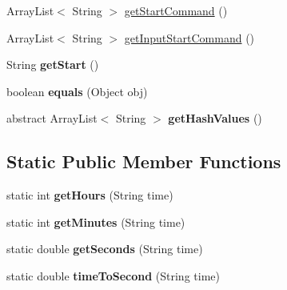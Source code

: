 \begin{DoxyCompactItemize}
\item 
ArrayList$<$ String $>$ \hyperlink{classvideo_1_1_profile_a378d8b6a9e694eb8051444a86ff7cad6}{getStartCommand} ()
\item 
ArrayList$<$ String $>$ \hyperlink{classvideo_1_1_profile_ae07aec7f4a871628fec90c056cf22638}{getInputStartCommand} ()
\item 
\hypertarget{classvideo_1_1_profile_ab5ed488fda54be68089310b63b854807}{
String {\bfseries getStart} ()}
\label{classvideo_1_1_profile_ab5ed488fda54be68089310b63b854807}

\item 
\hypertarget{classvideo_1_1_profile_ae8256f1d4879880a5e0557cbfff13237}{
boolean {\bfseries equals} (Object obj)}
\label{classvideo_1_1_profile_ae8256f1d4879880a5e0557cbfff13237}

\item 
\hypertarget{classvideo_1_1_profile_a6d6c49fde96388b672b165cce3fb0ebd}{
abstract ArrayList$<$ String $>$ {\bfseries getHashValues} ()}
\label{classvideo_1_1_profile_a6d6c49fde96388b672b165cce3fb0ebd}

\end{DoxyCompactItemize}
\subsection*{Static Public Member Functions}
\begin{DoxyCompactItemize}
\item 
\hypertarget{classvideo_1_1_profile_a1564131af01a721970347c072ab74cee}{
static int {\bfseries getHours} (String time)}
\label{classvideo_1_1_profile_a1564131af01a721970347c072ab74cee}

\item 
\hypertarget{classvideo_1_1_profile_ac055604e2ca11b4542f4950edd1ed8e8}{
static int {\bfseries getMinutes} (String time)}
\label{classvideo_1_1_profile_ac055604e2ca11b4542f4950edd1ed8e8}

\item 
\hypertarget{classvideo_1_1_profile_abfbff1b50a286514a7360e8a487c8df1}{
static double {\bfseries getSeconds} (String time)}
\label{classvideo_1_1_profile_abfbff1b50a286514a7360e8a487c8df1}

\item 
\hypertarget{classvideo_1_1_profile_ae9c355bb1ad4eea4710e1576f6491e7b}{
static double {\bfseries timeToSecond} (String time)}
\label{classvideo_1_1_profile_ae9c355bb1ad4eea4710e1576f6491e7b}

\end{DoxyCompactItemize}
